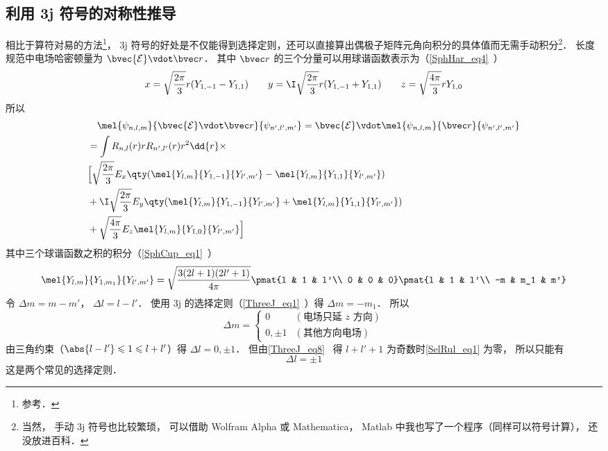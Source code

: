\subsection{利用 3j 符号的对称性推导}
相比于算符对易的方法\footnote{参考\cite{GriffQ}．}， 3j 符号的好处是不仅能得到选择定则，还可以直接算出偶极子矩阵元角向积分的具体值而无需手动积分\footnote{当然， 手动 3j 符号也比较繁琐， 可以借助 Wolfram Alpha 或 Mathematica， Matlab 中我也写了一个程序（同样可以符号计算）， 还没放进百科．}． 长度规范中电场哈密顿量为 $\bvec{\mathcal{E}}\vdot \bvec r$． 其中 $\bvec r$ 的三个分量可以用球谐函数表示为（\autoref{SphHar_eq4}~）
\begin{equation}
x = \sqrt{\frac{2\pi}{3}} r (Y_{1,-1} - Y_{1,1}) \qquad
y = \I \sqrt{\frac{2\pi}{3}} r (Y_{1,-1}+Y_{1,1}) \qquad
z = \sqrt{\frac{4\pi}{3}} rY_{1,0}
\end{equation}
所以
\begin{equation}
\begin{aligned}
&\quad\mel{\psi_{n,l,m}}{\bvec{\mathcal E}\vdot\bvec r}{\psi_{n',l',m'}} = \bvec{\mathcal E}\vdot\mel{\psi_{n,l,m}}{\bvec r}{\psi_{n',l',m'}}\\
&= \int R_{n,l}(r) r R_{n',l'}(r) r^2 \dd{r}\times\\
&\Big[\sqrt{\frac{2\pi}{3}} E_x \qty(\mel{Y_{l,m}}{Y_{1,-1}}{Y_{l',m'}} - \mel{Y_{l,m}}{Y_{1,1}}{Y_{l',m'}})\\
&+ \I\sqrt{\frac{2\pi}{3}} E_y \qty(\mel{Y_{l,m}}{Y_{1,-1}}{Y_{l',m'}} + \mel{Y_{l,m}}{Y_{1,1}}{Y_{l',m'}})\\
&+ \sqrt{\frac{4\pi}{3}} E_z \mel{Y_{l,m}}{Y_{1,0}}{Y_{l',m'}}\Big]
\end{aligned}
\end{equation}
其中三个球谐函数之积的积分（\autoref{SphCup_eq1}~）
\begin{equation}\label{SelRul_eq1}
\mel{Y_{l,m}}{Y_{1,m_1}}{Y_{l',m'}} = \sqrt{\frac{3(2l+1)(2l'+1)}{4\pi}} \pmat{l & 1 & l'\\ 0 & 0 & 0}\pmat{l & 1 & l'\\ -m & m_1 & m'}
\end{equation}
令 $\Delta m = m - m'$， $\Delta l = l - l'$． 使用 3j 的选择定则（\autoref{ThreeJ_eq1}~）得 $\Delta m = -m_1$． 所以
\begin{equation}
\Delta m =
\begin{cases}
0 & (\text{电场只延 $z$ 方向}) \\
0, \pm 1 & (\text{其他方向电场})
\end{cases}
\end{equation}
由三角约束（$\abs{l-l'} \leqslant 1 \leqslant l + l'$）得 $\Delta l = 0, \pm 1$． 但由\autoref{ThreeJ_eq8}~ 得 $l + l' + 1$ 为奇数时\autoref{SelRul_eq1} 为零， 所以只能有
\begin{equation}\label{SelRul_eq2}
 \Delta l = \pm 1
\end{equation}
这是两个常见的选择定则．

